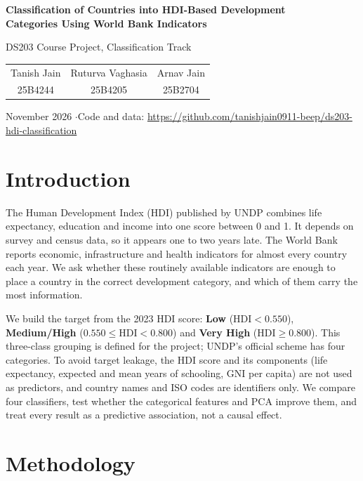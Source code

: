 \documentclass[10pt,a4paper]{article}
\begin{document}
\begin{center}
{\LARGE\bfseries Classification of Countries into HDI-Based Development\\[3pt] Categories Using World Bank Indicators\par}
\vspace{7pt}
{\large DS203 Course Project, Classification Track\par}
\vspace{7pt}
\begin{tabular}{ccc}
Tanish Jain & Ruturva Vaghasia & Arnav Jain\\
\small 25B4244 & \small 25B4205 & \small 25B2704
\end{tabular}\par
\vspace{3pt}
{\small November 2026 \quad$\cdot$\quad Code and data: \url{https://github.com/tanishjain0911-beep/ds203-hdi-classification}\par}
\end{center}

\section{Introduction}
The Human Development Index (HDI) published by UNDP combines life expectancy, education and income into one score
between 0 and 1. It depends on survey and census data, so it appears one to two years late. The World Bank reports
economic, infrastructure and health indicators for almost every country each year. We ask whether these routinely
available indicators are enough to place a country in the correct development category, and which of them carry
the most information.

We build the target from the 2023 HDI score: \textbf{Low} ($\text{HDI} < 0.550$), \textbf{Medium/High}
($0.550 \le \text{HDI} < 0.800$) and \textbf{Very High} ($\text{HDI} \ge 0.800$). This three-class grouping is
defined for the project; UNDP's official scheme has four categories. To avoid target leakage, the HDI score and its
components (life expectancy, expected and mean years of schooling, GNI per capita) are not used as predictors, and
country names and ISO codes are identifiers only. We compare four classifiers, test whether the categorical
features and PCA improve them, and treat every result as a predictive association, not a causal effect.

\section{Methodology}
\end{document}
